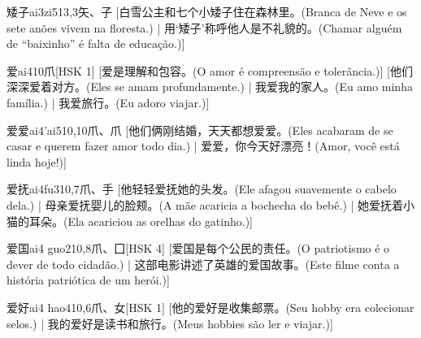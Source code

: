 \begin{entry}{矮子}{ai3zi5}{13,3}{⽮、⼦}
  [白雪公主和七个小矮子住在森林里。(Branca de Neve e os sete anões vivem na floresta.) | 用`矮子'称呼他人是不礼貌的。(Chamar alguém de ``baixinho'' é falta de educação.)]
\end{entry}

\begin{entry}{爱}{ai4}{10}{⽖}[HSK 1]
  [爱是理解和包容。(O amor é compreensão e tolerância.)]
  [他们深深爱着对方。(Eles se amam profundamente.) | 我爱我的家人。(Eu amo minha família.) | 我爱旅行。(Eu adoro viajar.)]
\end{entry}

\begin{entry}{爱爱}{ai4'ai5}{10,10}{⽖、⽖}
  [他们俩刚结婚，天天都想爱爱。(Eles acabaram de se casar e querem fazer amor todo dia.) | 爱爱，你今天好漂亮！(Amor, você está linda hoje!)]
\end{entry}

\begin{entry}{爱抚}{ai4fu3}{10,7}{⽖、⼿}
  [他轻轻爱抚她的头发。(Ele afagou suavemente o cabelo dela.) | 母亲爱抚婴儿的脸颊。(A mãe acaricia a bochecha do bebê.) | 她爱抚着小猫的耳朵。(Ela acariciou as orelhas do gatinho.)]
\end{entry}

\begin{entry}{爱国}{ai4 guo2}{10,8}{⽖、⼞}[HSK 4]
  [爱国是每个公民的责任。(O patriotismo é o dever de todo cidadão.) | 这部电影讲述了英雄的爱国故事。(Este filme conta a história patriótica de um herói.)]
\end{entry}

\begin{entry}{爱好}{ai4 hao4}{10,6}{⽖、⼥}[HSK 1]
  [他的爱好是收集邮票。(Seu hobby era colecionar selos.)  | 我的爱好是读书和旅行。(Meus hobbies são ler e viajar.)]
\end{entry}

